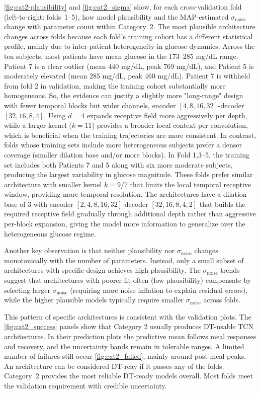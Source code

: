 \documentclass[preprint,12pt]{elsarticle}
\begin{document}
\begin{itemize}
\autoref{fig:cat2-plausibility} and \autoref{fig:cat2_sigma} show, for each cross-validation fold (left-to-right: folds~1--5), how model plausibility and the MAP-estimated $\sigma_{\text{noise}}$ change with parameter count within Category~2. The most plausible architecture changes across folds because each fold’s training cohort has a different statistical profile, mainly due to inter-patient heterogeneity in glucose dynamics. Across the ten subjects, most patients have mean glucose in the 173–285 mg/dL range. Patient 7 is a clear outlier (mean 440 mg/dL, peak 769 mg/dL), and Patient 5 is moderately elevated (mean 285 mg/dL, peak 460 mg/dL). Patient 7 is withheld from fold 2 in validation, making the training cohort substantially more homogeneous. So, the evidence can justify a slightly more "long-range" design with fewer temporal blocks but wider channels, encoder $[4,8,16,32]$-decoder $[32,16,8,4]$. Using $d=4$ expands receptive field more aggressively per depth, while a larger kernel ($k=11$) provides a broader local context per convolution, which is beneficial when the training trajectories are more consistent. In contrast, folds whose training sets include more heterogeneous subjects prefer a denser coverage (smaller dilation base and/or more blocks). In Fold 1,3–5, the training set includes both Patients 7 and 5 along with six more moderate subjects, producing the largest variability in glucose magnitude. These folds prefer similar architecture with smaller kernel $k{=}9/7$ that limits the local temporal receptive window, providing more temporal resolution. The architectures have a dilation base of 3 with encoder $[2,4,8,16,32]$-decoder $[32,16,8,4,2]$ that builds the required receptive field gradually through additional depth rather than aggressive per-block expansion, giving the model more information to generalize over the heterogeneous glucose regime. 


Another key observation is that neither plausibility nor $\sigma_{\text{noise}}$ changes monotonically with the number of parameters. Instead, only a small subset of architectures with specific design achieves high plausibility. The $\sigma_{\text{noise}}$ trends suggest that architectures with poorer fit often (low plausibility) compensate by selecting larger $\sigma_{\text{noise}}$ (requiring more noise inflation to explain residual errors), while the higher plausible models typically require smaller $\sigma_{\text{noise}}$ across folds. 

This pattern of specific architectures is consistent with the validation plots. The \autoref{fig:cat2_success} panels show that Category 2 usually produces DT-usable TCN architectures. In their prediction plots the predictive mean follows meal responses and recovery, and the uncertainty bands remain in tolerable ranges. A limited number of failures still occur \autoref{fig:cat2_falied}, mainly around post-meal peaks. An architecture can be considered DT-reay if it passes any of the folds. Category~2 provides the most reliable DT-ready models overall. Most folds meet the validation requirement with credible uncertainty.



\end{itemize}
\end{document}
